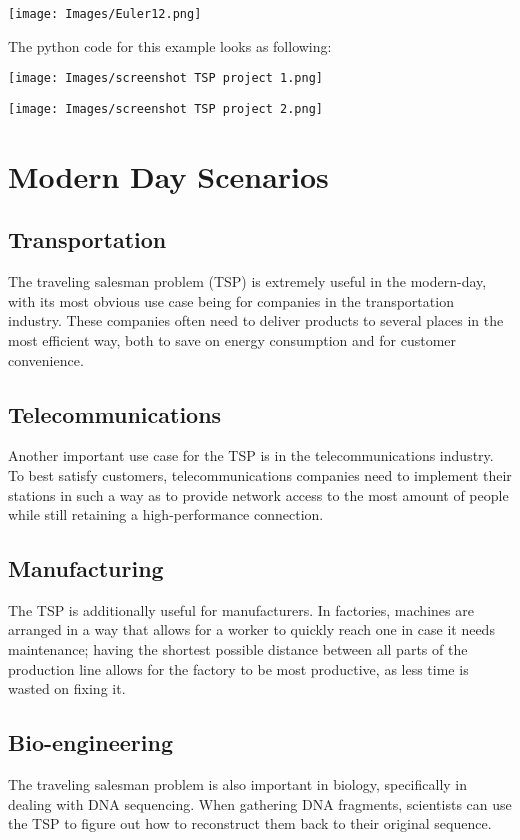 \documentclass{article}
\begin{document}
 \texttt{[image: Images/Euler12.png]}
    \label{example}

The python code for this example looks as following:

    \texttt{[image: Images/screenshot TSP project 1.png]}

    
    \texttt{[image: Images/screenshot TSP project 2.png]}
\cite{Dynamicprogramming}
    

\section{Modern Day Scenarios}  %
\subsection{Transportation}
The traveling salesman problem (TSP) is extremely useful in the modern-day, with its most obvious use case being for companies in the transportation industry. These companies often need to deliver products to several places in the most efficient way, both to save on energy consumption and for customer convenience. \cite{Optessa}

\subsection{Telecommunications}        
Another important use case for the TSP is in the telecommunications industry. To best satisfy customers, telecommunications companies need to implement their stations in such a way as to provide network access to the most amount of people while still retaining a high-performance connection. \cite{Optessa}
\subsection{Manufacturing}
The TSP is additionally useful for manufacturers. In factories, machines are arranged in a way that allows for a worker to quickly reach one in case it needs maintenance; having the shortest possible distance between all parts of the production line allows for the factory to be most productive, as less time is wasted on fixing it. \cite{Optessa}

\subsection{Bio-engineering}    
The traveling salesman problem is also important in biology, specifically in dealing with DNA sequencing.  When gathering DNA fragments, scientists can use the TSP to figure out how to reconstruct them back to their original sequence.
\cite{Optessa}
\end{document}
